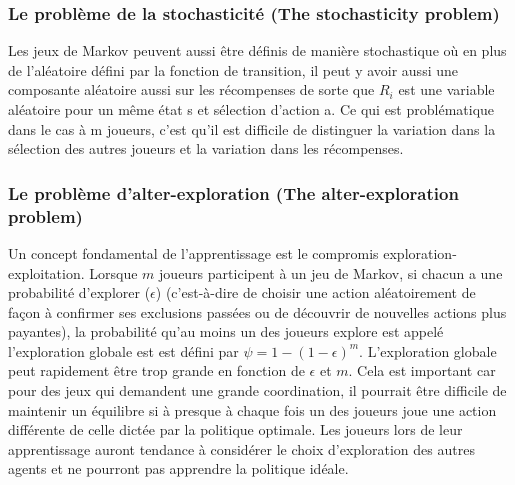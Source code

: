 \documentclass{article}
\theoremstyle{definition}
\begin{document}
\subsubsection{Le problème de la stochasticité (The stochasticity problem)}
Les jeux de Markov peuvent aussi être définis de manière stochastique où en plus de l'aléatoire défini par la fonction de transition, il peut y avoir aussi une composante aléatoire aussi sur les récompenses de sorte que $R_{i}$ est une variable aléatoire pour un même état s et sélection d'action a. Ce qui est problématique dans le cas à m joueurs, c'est qu'il est difficile de distinguer la variation dans la sélection des autres joueurs et la variation dans les récompenses. 

\subsubsection{Le problème d'alter-exploration (The alter-exploration problem)}
Un concept fondamental de l'apprentissage est le compromis exploration-exploitation. Lorsque $m$ joueurs participent à un jeu de Markov, si chacun a une probabilité d'explorer ($\epsilon$) (c'est-à-dire de choisir une action aléatoirement de façon à confirmer ses exclusions passées ou de découvrir de nouvelles actions plus payantes), la probabilité qu'au moins un des joueurs explore est appelé l'exploration globale est est défini par $\psi=1 - (1-\epsilon)^{m}$. L'exploration globale peut rapidement être trop grande en fonction de $\epsilon$ et $m$. Cela est important car pour des jeux qui demandent une grande coordination, il pourrait être difficile de maintenir un équilibre si à presque à chaque fois un des joueurs joue une action différente de celle dictée par la politique optimale. Les joueurs lors de leur apprentissage auront tendance à considérer le choix d'exploration des autres agents et ne pourront pas apprendre la politique idéale. 
\end{document}

